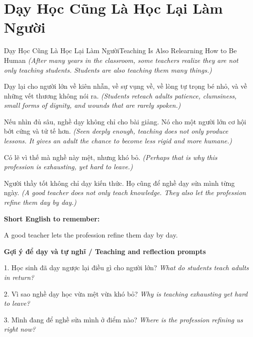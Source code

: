 \section{Dạy Học Cũng Là Học Lại Làm Người}
\begin{truyen}{Dạy Học Cũng Là Học Lại Làm Người}{Teaching Is Also Relearning How to Be Human}
\textit{(After many years in the classroom, some teachers realize they are not only teaching students. Students are also teaching them many things.)}

Dạy lại cho người lớn về kiên nhẫn, về sự vụng về, về lòng tự trọng bé nhỏ, và về những vết thương không nói ra.
\textit{(Students reteach adults patience, clumsiness, small forms of dignity, and wounds that are rarely spoken.)}

Nếu nhìn đủ sâu, nghề dạy không chỉ cho bài giảng. Nó cho một người lớn cơ hội bớt cứng và tử tế hơn.
\textit{(Seen deeply enough, teaching does not only produce lessons. It gives an adult the chance to become less rigid and more humane.)}

Có lẽ vì thế mà nghề này mệt, nhưng khó bỏ.
\textit{(Perhaps that is why this profession is exhausting, yet hard to leave.)}

\end{truyen}

\begin{baihoc}
Người thầy tốt không chỉ dạy kiến thức. Họ cũng để nghề dạy sửa mình từng ngày.
\textit{(A good teacher does not only teach knowledge. They also let the profession refine them day by day.)}
\end{baihoc}

\begin{ghinhoanh}
\textbf{Short English to remember:}

A good teacher lets the profession refine them day by day.

\end{ghinhoanh}

\begin{tuhocnhanh}
\textbf{Gợi ý để dạy và tự nghĩ / Teaching and reflection prompts}

1. Học sinh đã dạy ngược lại điều gì cho người lớn? \textit{What do students teach adults in return?}

2. Vì sao nghề dạy học vừa mệt vừa khó bỏ? \textit{Why is teaching exhausting yet hard to leave?}

3. Mình đang để nghề sửa mình ở điểm nào? \textit{Where is the profession refining us right now?}
\end{tuhocnhanh}
\ngancach

